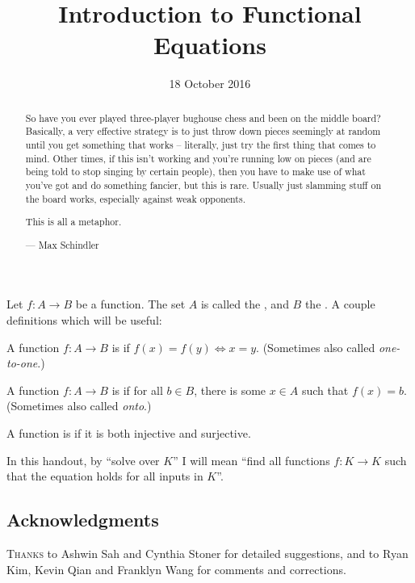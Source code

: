 \documentclass[11pt]{scrartcl}
\begin{document}
\title{Introduction to Functional Equations} %
\date{18 October 2016}
\maketitle

\begin{abstract}
  \sffamily\small
  So have you ever played three-player bughouse chess and been on the middle board?
  Basically, a very effective strategy is to just throw down pieces seemingly at random
  until you get something that works -- literally, just try the first thing that comes
  to mind. Other times, if this isn't working and you're running low on pieces
  {\scriptsize (and are being told to stop singing by certain people)}, then you have to
  make use of what you've got and do something fancier, but this is rare. Usually just
  slamming stuff on the board works, especially against weak opponents.

  This is all a metaphor.

  \medskip

  --- Max Schindler
\end{abstract}

\vspace{1em}

Let $f\colon A \to B$ be a function.
The set $A$ is called the , and $B$ the .
A couple definitions which will be useful:
\begin{definition}
  A function $f\colon A \to B$ is  if $f(x) = f(y) \iff x=y$.
  (Sometimes also called \emph{one-to-one}.)
\end{definition}
\begin{definition}
  A function $f\colon A \to B$ is  if for all $b \in B$,
  there is some $x \in A$ such that $f(x) = b$.
  (Sometimes also called \emph{onto}.)
\end{definition}
\begin{definition}
  A function is  if it is both injective and surjective.
\end{definition}

In this handout, by ``solve over $K$''
I will mean ``find all functions $f \colon K \to K$ such
that the equation holds for all inputs in $K$''.

\subsection*{Acknowledgments}
\textsc{Thanks} to Ashwin Sah and Cynthia Stoner for detailed suggestions,
and to Ryan Kim, Kevin Qian and Franklyn Wang for comments and corrections.
\end{document}
